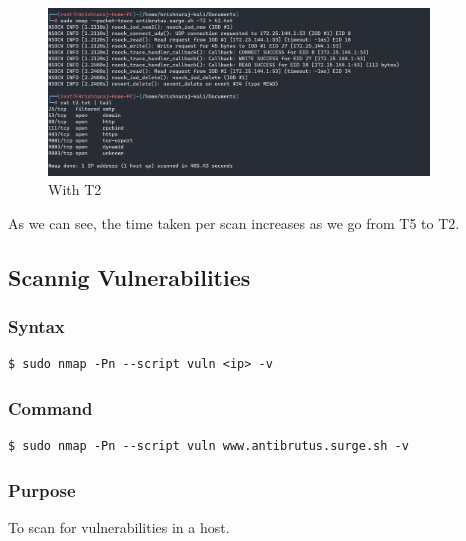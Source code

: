 \documentclass[11pt]{article}
\begin{document}
\begin{figure}[H]
    \centering
    \includegraphics[width=0.9\textwidth]{t2.png}
    \caption{With T2}
    \label{fig:1}
\end{figure}

As we can see, the time taken per scan increases as we go from T5 to T2.


\subsection{Scannig Vulnerabilities}
\subsubsection{Syntax}
\begin{verbatim}
$ sudo nmap -Pn --script vuln <ip> -v
\end{verbatim}

\subsubsection*{Command}
\begin{verbatim}
$ sudo nmap -Pn --script vuln www.antibrutus.surge.sh -v
\end{verbatim}

\subsubsection*{Purpose}
To scan for vulnerabilities in a host.
\end{document}
